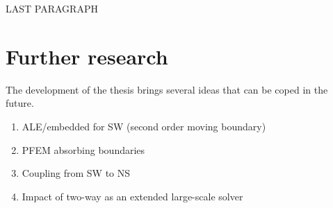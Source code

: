 LAST PARAGRAPH




\section{Further research}


The development of the thesis brings several ideas that can be coped in the future. 
\begin{enumerate}
    \item ALE/embedded for SW (second order moving boundary)
    \item PFEM absorbing boundaries
    \item Coupling from SW to NS
    \item Impact of two-way as an extended large-scale solver
\end{enumerate}


